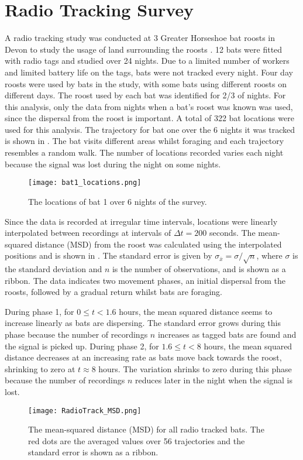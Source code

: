 
\section{Radio Tracking Survey}

A radio tracking study was conducted at 3 Greater Horseshoe bat roosts in Devon to
study the usage of land surrounding the roosts \cite{Mathews2009}. 12 bats were fitted with
radio tags and studied over 24 nights. Due to a limited number of workers and
 limited battery life on the tags, bats were not tracked every night. Four day
 roosts were used by bats in the study, with some bats using different roosts on
 different days. The roost used by each bat was identified for 2/3 of nights.
 For this analysis, only the
data from nights when a bat's roost was known was used, since the dispersal
from the roost is important.
A total of 322 bat locations were used for this analysis. The trajectory for bat
one over the 6 nights it was tracked is shown in .  The bat visits different areas whilst foraging and each trajectory resembles a random walk. The number of
locations recorded varies each night because the signal was lost during the night
 on some nights.

\begin{figure} [h]
    \centering
        \texttt{[image: bat1\_locations.png]}
        \caption{The locations of bat 1 over 6 nights of the survey.}
    \label{fig:bat1}
\end{figure}

Since the data is recorded at irregular time intervals, locations were linearly
interpolated between recordings at intervals of $\Delta t = 200$ seconds.
The mean-squared distance (MSD) from the roost was calculated using the
interpolated positions and is shown in . The standard error is given by $\sigma_{\bar{x}} = \sigma/\sqrt{n}$, where
$\sigma$ is the standard deviation and $n$ is the number of observations, and is
shown as a ribbon. The data indicates two movement phases, an initial dispersal from the roosts, followed by a gradual return whilst bats are foraging.

During phase 1, for $0 \leq t < 1.6$ hours, the mean squared distance seems to increase linearly as bats are dispersing. The standard error grows during this phase because the number of recordings $n$ increases as tagged bats are found and the signal is picked up. During phase 2, for $1.6 \leq t < 8$ hours, the mean squared distance decreases at an increasing rate as bats move back towards the roost, shrinking to zero at $t \approx 8$ hours. The variation shrinks to zero during this phase because the number of recordings $n$ reduces later
in the night when the signal is lost.
%
\begin{figure} [h]
    \centering
        \texttt{[image: RadioTrack\_MSD.png]}
        \caption{The mean-squared distance (MSD) for all radio tracked bats.
        The red dots are the averaged values over 56 trajectories and the standard error is shown as a ribbon.}
    \label{fig:MSD}
\end{figure}

